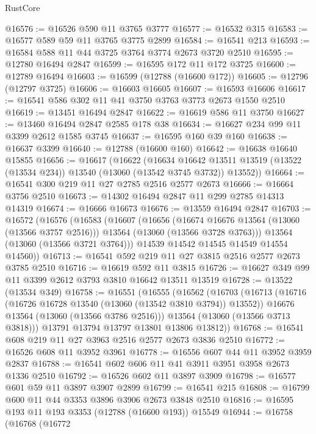 \begin{lexlean}{RustCore}
\begin{coremodule}
@16576 := @16526 @590 @11 @3765 @3777
@16577 := @16532 @315
@16583 := @16577 @589 @59 @11 @3765 @3775 @2899
@16584 := @16541 @213
@16593 := @16584 @588 @11 @44 @3725 @3764 @3774 @2673 @3720 @2510
@16595 := @12780 @16494 @2847
@16599 := @16595 @172 @11 @172 @3725
@16600 := @12789 @16494
@16603 := @16599 (@12788 (@16600 @172))
@16605 := @12796 (@12797 @3725)
@16606 := @16603 @16605
@16607 := @16593 @16606
@16617 := @16541 @586 @302 @11 @41 @3750 @3763 @3773 @2673 @1550 @2510
@16619 := @13451 @16494 @2847
@16622 := @16619 @586 @11 @3750
@16627 := @13460 @16494 @2847 @2585 @178 @38
@16634 := @16627 @234 @99 @11 @3399 @2612 @1585 @3745
@16637 := @16595 @160 @39 @160
@16638 := @16637 @3399
@16640 := @12788 (@16600 @160)
@16642 := @16638 @16640 @15855
@16656 := @16617
    (@16622
      (@16634
        @16642
        @13511
        @13519
        (@13522 (@13534 @234))
        @13540
        (@13060 (@13542 @3745 @3732))
        @13552))
@16664 := @16541 @300 @219 @11 @27 @2785 @2516 @2577 @2673
@16666 := @16664 @3756 @2510
@16673 := @14302 @16494 @2847 @11 @299 @2785 @14313 @14319
@16674 := @16666 @16673
@16676 := @13559 @16494 @2847
@16703 := @16572
    (@16576
      (@16583
        (@16607
          (@16656
            (@16674 @16676 @13564 (@13060 (@13566 @3757 @2516)))
            @13564
            (@13060 (@13566 @3728 @3763)))
          @13564
          (@13060 (@13566 @3721 @3764)))
        @14539
        @14542
        @14545
        @14549
        @14554
        @14560))
@16713 := @16541 @592 @219 @11 @27 @3815 @2516 @2577 @2673 @3785 @2510
@16716 := @16619 @592 @11 @3815
@16726 := @16627 @349 @99 @11 @3399 @2612 @3793 @3810 @16642 @13511 @13519
@16728 := @13522 (@13534 @349)
@16758 := @16551
    (@16555
      (@16562
        (@16703
          (@16713
            (@16716 (@16726 @16728 @13540 (@13060 (@13542 @3810 @3794)) @13552))
            @16676
            @13564
            (@13060 (@13566 @3786 @2516)))
          @13564
          (@13060 (@13566 @3713 @3818)))
        @13791
        @13794
        @13797
        @13801
        @13806
        @13812))
@16768 := @16541 @608 @219 @11 @27 @3963 @2516 @2577 @2673 @3836 @2510
@16772 := @16526 @608 @11 @3952 @3961
@16778 := @16556 @607 @44 @11 @3952 @3959 @2837
@16788 := @16541 @602 @606 @11 @41 @3911 @3951 @3958 @2673 @1336 @2510
@16792 := @16526 @602 @11 @3897 @3909
@16798 := @16577 @601 @59 @11 @3897 @3907 @2899
@16799 := @16541 @215
@16808 := @16799 @600 @11 @44 @3353 @3896 @3906 @2673 @3848 @2510
@16816 := @16595 @193 @11 @193 @3353 (@12788 (@16600 @193)) @15549
@16944 := @16758
    (@16768
      (@16772

\end{coremodule}
\end{lexlean}
